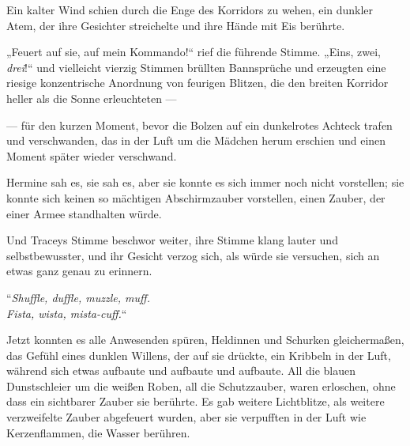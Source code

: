 Ein kalter Wind schien durch die Enge des Korridors zu wehen, ein dunkler Atem, der ihre Gesichter streichelte und ihre Hände mit Eis berührte.

„Feuert auf sie, auf mein Kommando!“ rief die führende Stimme.
„Eins, zwei, \emph{drei}!“ und vielleicht vierzig Stimmen brüllten Bannsprüche und erzeugten eine riesige konzentrische Anordnung von feurigen Blitzen, die den breiten Korridor heller als die Sonne erleuchteten —

— für den kurzen Moment, bevor die Bolzen auf ein dunkelrotes Achteck trafen und verschwanden, das in der Luft um die Mädchen herum erschien und einen Moment später wieder verschwand.

Hermine sah es, sie sah es, aber sie konnte es sich immer noch nicht vorstellen; sie konnte sich keinen so mächtigen Abschirmzauber vorstellen, einen Zauber, der einer Armee standhalten würde.

Und Traceys Stimme beschwor weiter, ihre Stimme klang lauter und selbstbewusster, und ihr Gesicht verzog sich, als würde sie versuchen, sich an etwas ganz genau zu erinnern.

“\emph{Shuffle, duffle, muzzle, muff.\\
Fista, wista, mista-cuff.}“

Jetzt konnten es alle Anwesenden spüren, Heldinnen und Schurken gleichermaßen, das Gefühl eines dunklen Willens, der auf sie drückte, ein Kribbeln in der Luft, während sich etwas aufbaute und aufbaute und aufbaute. All die blauen Dunstschleier um die weißen Roben, all die Schutzzauber, waren erloschen, ohne dass ein sichtbarer Zauber sie berührte. Es gab weitere Lichtblitze, als weitere verzweifelte Zauber abgefeuert wurden, aber sie verpufften in der Luft wie Kerzenflammen, die Wasser berühren.

